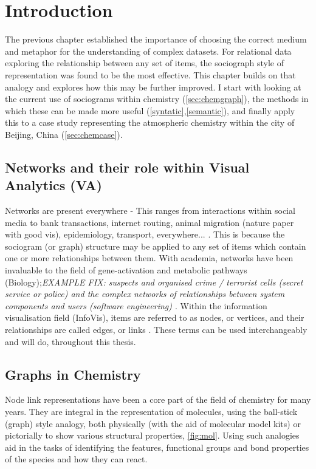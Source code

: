\section{Introduction}

The previous chapter established the importance of choosing the correct medium and metaphor for the understanding of complex datasets. For relational data exploring the relationship between any set of items, the sociograph style of representation was found to be the most effective. This chapter builds on that analogy and explores how this may be further improved. I start with looking at the current use of sociograms within chemistry (\autoref{sec:chemgraph}), the methods in which these can be made more useful (\autoref{syntatic},\autoref{semantic}), and finally apply this to a case study representing the atmospheric chemistry within the city of Beijing, China (\autoref{sec:chemcase}).

\subsection{Networks and their role within Visual Analytics (VA)} \label{sec:va}
Networks are present everywhere - This ranges from interactions within social media to bank transactions, internet routing, animal migration (nature paper with good vis), epidemiology, transport, everywhere... \cite{worldmap,a,b,c}. This is because the sociogram (or graph) structure may be applied to any set of items which contain one or more relationships between them. With academia, networks have been invaluable to the field of gene-activation and metabolic pathways (Biology);\textit{EXAMPLE FIX: suspects and organised crime / terrorist cells (secret service or police) and the complex networks of relationships between system components and users (software engineering) \cite{IPSEPCOLA} }. Within the information visualisation field (InfoVis), items are referred to as nodes, or vertices, and their relationships are called edges, or links \cite{ch1}. These terms can be used interchangeably and will do, throughout this thesis. 


\subsection{Graphs in Chemistry}\label{sec:chemgraph}



Node link representations have been a core part of the field of chemistry for many years. They are integral in the representation of molecules, using the ball-stick (graph) style analogy, both physically (with the aid of molecular model kits) or pictorially to show various structural properties, \autoref{fig:mol}. Using such analogies aid in the tasks of identifying the features, functional groups and bond properties of the species and how they can react.  

